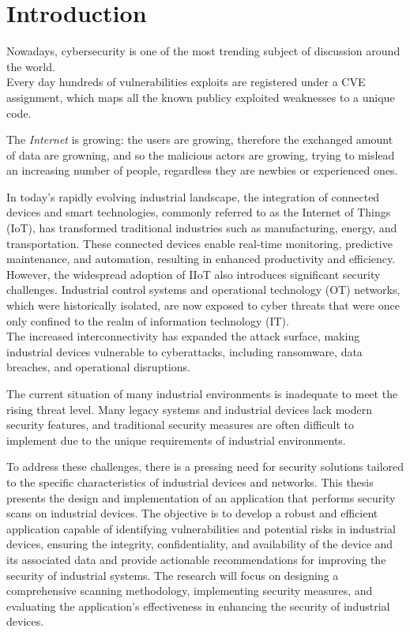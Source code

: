 \chapter{Introduction}
\label{cha:intro}

Nowadays, cybersecurity is one of the most trending subject of discussion around the world.\\
Every day hundreds of vulnerabilities exploits are registered under a CVE assignment, which maps all the known publicy exploited weaknesses to a unique code.

The \textit{Internet} is growing: the users are growing, therefore the exchanged amount of data are growning, and so the malicious actors are growing, trying to mislead an increasing number of people, regardless they are newbies or experienced ones.

In today's rapidly evolving industrial landscape, the integration of connected devices and smart technologies, commonly referred to as the Internet of Things (IoT), has transformed traditional industries such as manufacturing, energy, and transportation. These connected devices enable real-time monitoring, predictive maintenance, and automation, resulting in enhanced productivity and efficiency. \\
However, the widespread adoption of IIoT also introduces significant security challenges. Industrial control systems and operational technology (OT) networks, which were historically isolated, are now exposed to cyber threats that were once only confined to the realm of information technology (IT). \\
The increased interconnectivity has expanded the attack surface, making industrial devices vulnerable to cyberattacks, including ransomware, data breaches, and operational disruptions.

The current situation of many industrial environments is inadequate to meet the rising threat level. Many legacy systems and industrial devices lack modern security features, and traditional security measures are often difficult to implement due to the unique requirements of industrial environments.

To address these challenges, there is a pressing need for security solutions tailored to the specific characteristics of industrial devices and networks. This thesis presents the design and implementation of an application that performs security scans on industrial devices. The objective is to develop a robust and efficient application capable of identifying vulnerabilities and potential risks in industrial devices, ensuring the integrity, confidentiality, and availability of the device and its associated data and provide actionable recommendations for improving the security of industrial systems. The research will focus on designing a comprehensive scanning methodology, implementing security measures, and evaluating the application's effectiveness in enhancing the security of industrial devices. 

